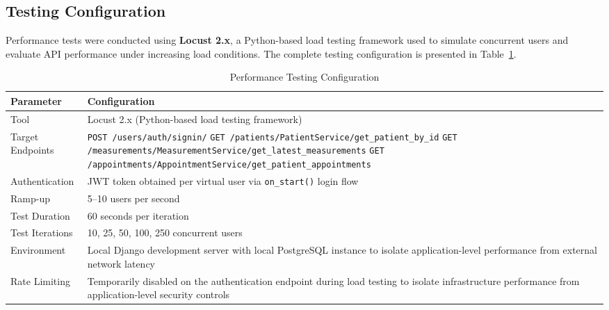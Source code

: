 \subsection{Testing Configuration}

Performance tests were conducted using \textbf{Locust 2.x}, a Python-based load testing framework used to simulate concurrent users and evaluate API performance under increasing load conditions. The complete testing configuration is presented in Table~\ref{tab:testing_config}.

\begin{table}[H]
\centering
\caption{Performance Testing Configuration}
\label{tab:testing_config}
\renewcommand{\arraystretch}{1.3}
\begin{tabular}{|p{2.5cm}|p{13cm}|}
\hline
\rowcolor{orange!20}
\textbf{Parameter} & \textbf{Configuration} \\
\hline
Tool & Locust 2.x (Python-based load testing framework) \\
\hline
Target Endpoints &
\texttt{POST /users/auth/signin/} \newline
\texttt{GET /patients/PatientService/get\_patient\_by\_id} \newline
\texttt{GET /measurements/MeasurementService/get\_latest\_measurements} \newline
\texttt{GET /appointments/AppointmentService/get\_patient\_appointments} \\
\hline
Authentication & JWT token obtained per virtual user via \texttt{on\_start()} login flow \\
\hline
Ramp-up & 5--10 users per second \\
\hline
Test Duration & 60 seconds per iteration \\
\hline
Test Iterations & 10, 25, 50, 100, 250 concurrent users \\
\hline
Environment & Local Django development server with local PostgreSQL instance to isolate application-level performance from external network latency \\
\hline
Rate Limiting & Temporarily disabled on the authentication endpoint during load testing to isolate infrastructure performance from application-level security controls \\
\hline
\end{tabular}
\end{table}
